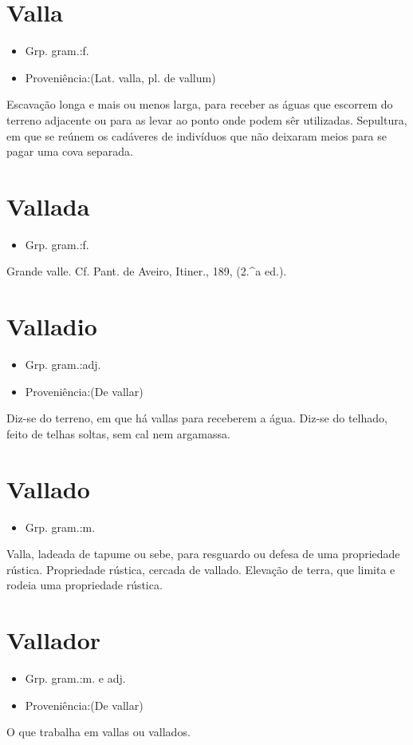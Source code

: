 \documentclass{article}
\begin{document}
\section{Valla}
\begin{itemize}
\item {Grp. gram.:f.}
\end{itemize}
\begin{itemize}
\item {Proveniência:(Lat. \textunderscore valla\textunderscore , pl. de \textunderscore vallum\textunderscore )}
\end{itemize}
Escavação longa e mais ou menos larga, para receber as águas que escorrem do terreno adjacente ou para as levar ao ponto onde podem sêr utilizadas.
Sepultura, em que se reúnem os cadáveres de indivíduos que não deixaram meios para se pagar uma cova separada.
\section{Vallada}
\begin{itemize}
\item {Grp. gram.:f.}
\end{itemize}
Grande valle. Cf. Pant. de Aveiro, \textunderscore Itiner.\textunderscore , 189, (2.^a ed.).
\section{Valladio}
\begin{itemize}
\item {Grp. gram.:adj.}
\end{itemize}
\begin{itemize}
\item {Proveniência:(De \textunderscore vallar\textunderscore )}
\end{itemize}
Diz-se do terreno, em que há vallas para receberem a água.
Diz-se do telhado, feito de telhas soltas, sem cal nem argamassa.
\section{Vallado}
\begin{itemize}
\item {Grp. gram.:m.}
\end{itemize}
Valla, ladeada de tapume ou sebe, para resguardo ou defesa de uma propriedade rústica.
Propriedade rústica, cercada de vallado.
Elevação de terra, que limita e rodeia uma propriedade rústica.
\section{Vallador}
\begin{itemize}
\item {Grp. gram.:m.  e  adj.}
\end{itemize}
\begin{itemize}
\item {Proveniência:(De \textunderscore vallar\textunderscore )}
\end{itemize}
O que trabalha em vallas ou vallados.
\end{document}
